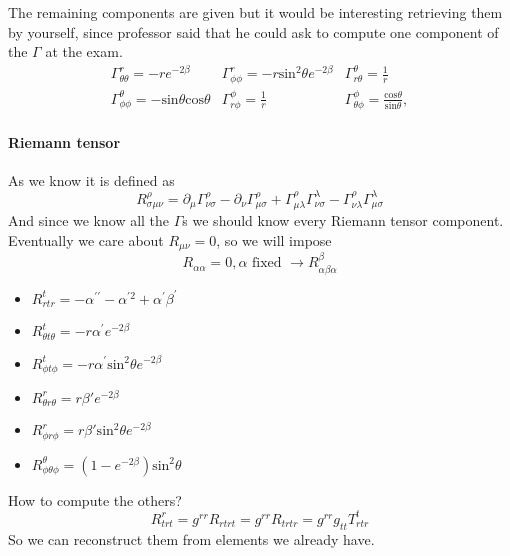 The remaining components are given but it would be interesting retrieving them by yourself, since professor said that he could ask to compute one component of the $\Gamma $ at the exam.
\begin{equation}
\begin{matrix}
	\Gamma ^{r}_{\theta \theta } = - r e^{-2\beta } & \Gamma ^{r}_{\phi \phi } = -r \text{sin}^{2}\theta e^{-2\beta } & \Gamma^{\theta }_{r\theta } = \frac{1}{r} \\
	\Gamma ^{\theta }_{\phi \phi } = -\text{sin} \theta \text{cos} \theta  & \Gamma ^{\phi }_{r\phi } = \frac{1}{r} & \Gamma ^{\phi }_{\theta \phi } = \frac{ \text{cos} \theta }{\text{sin} \theta } ,
\end{matrix} 
\end{equation}

\paragraph{Riemann tensor}
As we know it is defined as
\[
R^{\rho }_{\sigma \mu \nu } = \partial_{\mu }\Gamma ^{\rho }_{\nu \sigma }- \partial_{\nu }\Gamma ^{\rho }_{\mu \sigma } + \Gamma ^{\rho }_{\mu \lambda }\Gamma ^{\lambda }_{\nu \sigma }- \Gamma ^{\rho }_{\nu \lambda }\Gamma ^{\lambda }_{\mu \sigma }
\]
And since we know all the $\Gamma$s we should know every Riemann tensor component. Eventually we care about $R_{\mu \nu } = 0$, so we will impose
\[
R_{\alpha \alpha } = 0, \alpha \text{ fixed } \to R^{\beta }_{\alpha \beta \alpha }
\]
\begin{itemize}
\item $R^{t}_{rtr} = -\alpha^{\prime \prime } -\alpha ^{\prime 2} +\alpha^{\prime }\beta ^{\prime }$
\item $R^{t}_{\theta  t \theta } = -r \alpha^{\prime } e^{-2\beta }$
\item $R^{t}_{\phi t \phi } = -r \alpha^{\prime } \text{sin}^{2} \theta  e^{-2\beta }$
\item $R^{r}_{\theta r \theta } = r\beta ' e^{-2\beta }$
\item $R^{r}_{\phi r \phi } = r \beta ' \text{sin}^{2}\theta  e^{-2\beta }$
\item $R^{\theta }_{\phi \theta \phi } = \left( 1-e^{-2\beta } \right)\text{sin}^{2} \theta $
\end{itemize}
How to compute the others?
\begin{equation}
R^{r}_{trt} = g^{rr}R_{rtrt} = g^{rr}R_{trtr} = g^{rr}g_{tt}T^{t}_{rtr}
\end{equation}
So we can reconstruct them from elements we already have.


